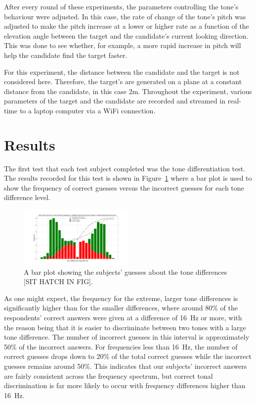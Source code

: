 \documentclass[format=sigconf, review=true, screen=true, anonymous=true]{acmart}
\begin{document}
After every round of these experiments, the parameters controlling the tone's behaviour were adjusted. In this case, the rate of change of the tone's pitch was adjusted to make the pitch increase at a lower or higher rate as a function of the elevation angle between the target and the candidate's current looking direction. This was done to see whether, for example, a more rapid increase in pitch will help the candidate find the target faster. 

For this experiment, the distance between the candidate and the target is not considered here. Therefore, the target's are generated on a plane at a constant distance from the candidate, in this case 2m. Throughout the experiment, various parameters of the target and the candidate are recorded and streamed in real-time to a laptop computer via a WiFi connection.

\section{Results}

The first test that each test subject completed was the tone differentiation test. The results recorded for this test is shown in Figure~\ref{fig:tone-guesses} where a bar plot is used to show the frequency of correct guesses versus the incorrect guesses for each tone difference level. 

\begin{figure}
  \centering
  \includegraphics[width=0.5\textwidth]{figures/tone_guesses.png}
  \caption{A bar plot showing the subjects' guesses about the tone differences [SIT HATCH IN FIG].}
  \label{fig:tone-guesses}
\end{figure}

As one might expect, the frequency for the extreme, larger tone differences is significantly higher than for the smaller differences, where around 80\% of the respondents' correct answers were given at a difference of \SI{16}{\hertz} or more, with the reason being that it is easier to discriminate between two tones with a large tone difference. The number of incorrect guesses in this interval is approximately 50\% of the incorrect answers. For frequencies less than \SI{16}{\hertz}, the number of correct guesses drops down to 20\% of the total correct guesses while the incorrect guesses remains around 50\%. This indicates that our subjects' incorrect answers are fairly consistent across the frequency spectrum, but correct tonal discrimination is far more likely to occur with frequency differences higher than \SI{16}{\hertz}.  
\end{document}
